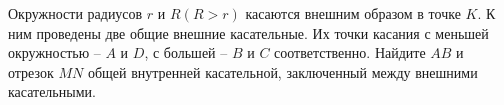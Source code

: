 \begin{ex}
	\begin{condition}
		Окружности радиусов \( r \) и \( R (R > r)  \) касаются внешним образом в точке \( K \). К ним проведены две общие внешние касательные. Их точки касания с меньшей окружностью – \( A  \) и \( D \), с большей – \( B  \) и \( C  \) соответственно. Найдите \( AB  \) и отрезок \( MN  \) общей внутренней касательной, заключенный между внешними касательными.
	\end{condition}
\end{ex}